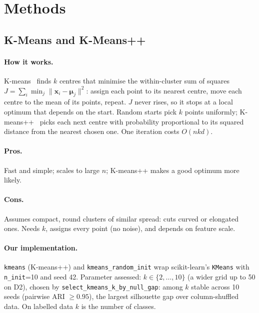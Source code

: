 \section{Methods}\label{sec:methods}


\subsection{K-Means and K-Means++}
\paragraph{How it works.} K-means~\cite{lloyd1982} finds $k$ centres that minimise the within-cluster sum
of squares $J=\sum_{i}\min_j\lVert\mathbf{x}_i-\boldsymbol{\mu}_j\rVert^2$: assign each point to its
nearest centre, move each centre to the mean of its points, repeat. $J$ never rises, so it stops at a
local optimum that depends on the start. Random starts pick $k$ points uniformly; K-means++~\cite{arthur2007}
picks each next centre with probability proportional to its squared distance from the nearest chosen one.
One iteration costs $O(nkd)$.
\paragraph{Pros.} Fast and simple; scales to large $n$; K-means++ makes a good optimum more likely.
\paragraph{Cons.} Assumes compact, round clusters of similar spread: cuts curved or elongated ones. Needs
$k$, assigns every point (no noise), and depends on feature scale.
\paragraph{Our implementation.} \texttt{kmeans} (K-means++) and \texttt{kmeans\_random\_init} wrap
scikit-learn's \texttt{KMeans} with \texttt{n\_init}=10 and seed 42. Parameter assessed: $k\in\{2,\dots,10\}$
(a wider grid up to 50 on D2), chosen by \texttt{select\_kmeans\_k\_by\_null\_gap}: among $k$ stable across
10 seeds (pairwise ARI $\geq0.95$), the largest silhouette gap over column-shuffled data. On labelled
data $k$ is the number of classes.

